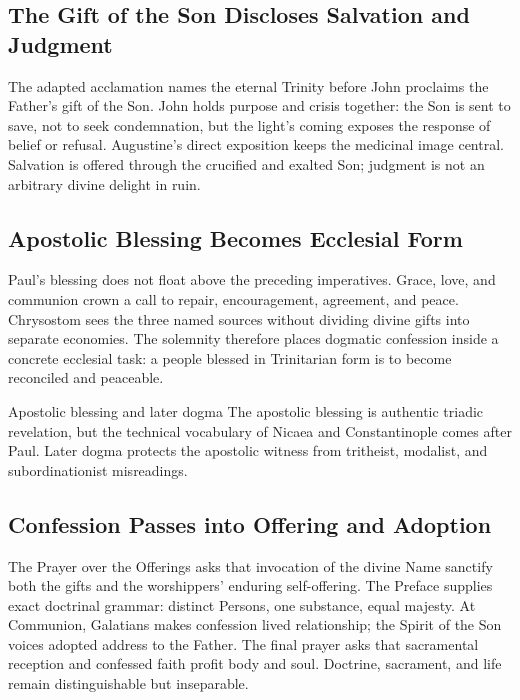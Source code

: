 \subsection*{The Gift of the Son Discloses Salvation and Judgment\enspace{}}

The adapted acclamation names the eternal Trinity before John proclaims the Father's gift of the Son. John holds purpose and crisis together: the Son is sent to save, not to seek condemnation, but the light's coming exposes the response of belief or refusal. Augustine's direct exposition keeps the medicinal image central. Salvation is offered through the crucified and exalted Son; judgment is not an arbitrary divine delight in ruin.

\subsection*{Apostolic Blessing Becomes Ecclesial Form\enspace{}}

Paul's blessing does not float above the preceding imperatives. Grace, love, and communion crown a call to repair, encouragement, agreement, and peace. Chrysostom sees the three named sources without dividing divine gifts into separate economies. The solemnity therefore places dogmatic confession inside a concrete ecclesial task: a people blessed in Trinitarian form is to become reconciled and peaceable.

\begin{studybox}{Apostolic blessing and later dogma}
The apostolic blessing is authentic triadic revelation, but the technical vocabulary of Nicaea and Constantinople comes after Paul. Later dogma protects the apostolic witness from tritheist, modalist, and subordinationist misreadings.
\end{studybox}

\subsection*{Confession Passes into Offering and Adoption\enspace{}}

The Prayer over the Offerings asks that invocation of the divine Name sanctify both the gifts and the worshippers' enduring self-offering. The Preface supplies exact doctrinal grammar: distinct Persons, one substance, equal majesty. At Communion, Galatians makes confession lived relationship; the Spirit of the Son voices adopted address to the Father. The final prayer asks that sacramental reception and confessed faith profit body and soul. Doctrine, sacrament, and life remain distinguishable but inseparable.
